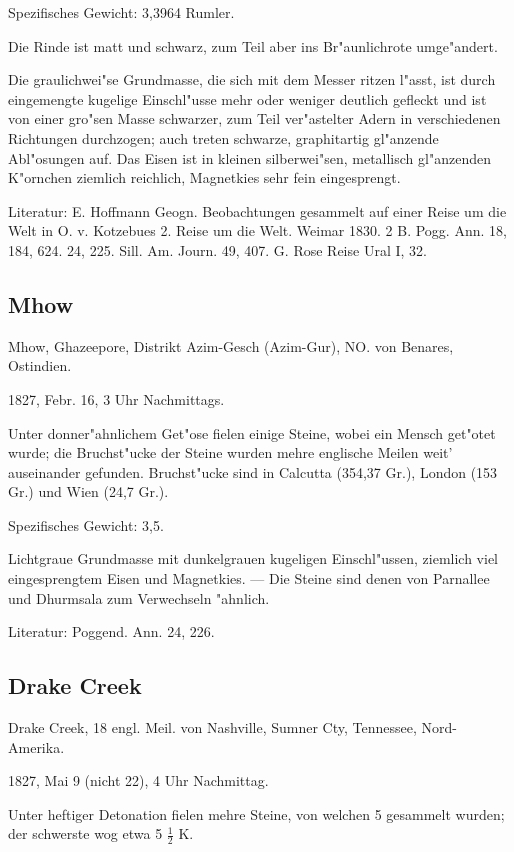 \documentclass[a4paper, 11pt, oneside]{article}
\begin{document}
Spezifisches Gewicht: 3,3964 Rumler.

Die Rinde ist matt und schwarz, zum Teil aber ins Br"aunlichrote umge"andert.

Die graulichwei"se Grundmasse, die sich mit dem Messer ritzen l"asst, ist durch eingemengte kugelige Einschl"usse mehr oder weniger deutlich gefleckt und ist von einer gro"sen Masse schwarzer, zum Teil ver"astelter Adern in verschiedenen Richtungen durchzogen; auch treten schwarze, graphitartig gl"anzende Abl"osungen auf. Das Eisen ist in kleinen silberwei"sen, metallisch gl"anzenden K"ornchen ziemlich reichlich, Magnetkies sehr fein eingesprengt.

Literatur: E. Hoffmann Geogn. Beobachtungen gesammelt auf einer Reise um die Welt in O. v. Kotzebues 2. Reise um die Welt. Weimar 1830. 2 B. Pogg. Ann. 18, 184, 624. 24, 225. Sill. Am. Journ. 49, 407. G. Rose Reise Ural I, 32.

\subsection{Mhow}

Mhow, Ghazeepore, Distrikt Azim-Gesch (Azim-Gur), NO. von Benares, Ostindien.

1827, Febr. 16, 3 Uhr Nachmittags.

Unter donner"ahnlichem Get"ose fielen einige Steine, wobei ein Mensch get"otet wurde; die Bruchst"ucke der Steine wurden mehre englische Meilen weit' auseinander gefunden. Bruchst"ucke sind in Calcutta (354,37 Gr.), London (153 Gr.) und Wien (24,7 Gr.).

Spezifisches Gewicht: 3,5.

Lichtgraue Grundmasse mit dunkelgrauen kugeligen Einschl"ussen, ziemlich viel eingesprengtem Eisen und Magnetkies. --- Die Steine sind denen von Parnallee und Dhurmsala zum Verwechseln "ahnlich.

Literatur: Poggend. Ann. 24, 226.

\subsection{Drake Creek}

Drake Creek, 18 engl. Meil. von Nashville, Sumner Cty, Tennessee, Nord-Amerika.

1827, Mai 9 (nicht 22), 4 Uhr Nachmittag.

Unter heftiger Detonation fielen mehre Steine, von welchen 5 gesammelt wurden; der schwerste wog etwa 5 $\frac{1}{2}$ K.
\end{document}
